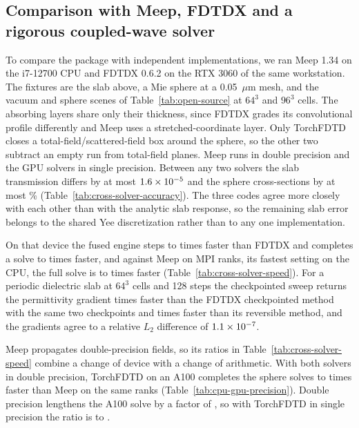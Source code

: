 \documentclass[11pt,a4paper]{article}
\newcommand{\micron}{\ensuremath{\mu\mathrm{m}}}
\begin{document}
\subsection{Comparison with Meep, FDTDX and a rigorous coupled-wave solver}
\label{sec:cross-solver}

To compare the package with independent implementations, we ran Meep 1.34 \citep{oskooi2010} on the i7-12700 CPU and FDTDX 0.6.2 \citep{mahlau2024} on the RTX 3060 of the same workstation. The fixtures are the slab above, a Mie sphere at a 0.05~\micron{} mesh, and the vacuum and sphere scenes of Table~\ref{tab:open-source} at $64^{3}$ and $96^{3}$ cells. The absorbing layers share only their thickness, since FDTDX grades its convolutional profile differently and Meep uses a stretched-coordinate layer. Only TorchFDTD closes a total-field/scattered-field box around the sphere, so the other two subtract an empty run from total-field planes. Meep runs in double precision and the GPU solvers in single precision. Between any two solvers the slab transmission differs by at most $1.6\times10^{-5}$ and the sphere cross-sections by at most \CrossSpherePair\% (Table~\ref{tab:cross-solver-accuracy}). The three codes agree more closely with each other than with the analytic slab response, so the remaining slab error belongs to the shared Yee discretization rather than to any one implementation.

On that device the fused engine steps \CrossFdtdxStepMin{} to \CrossFdtdxStepMax{} times faster than FDTDX and completes a solve \CrossFdtdxFullMin{} to \CrossFdtdxFullMax{} times faster, and against Meep on \CrossMeepRanks{} MPI ranks, its fastest setting on the CPU, the full solve is \CrossMeepFullMin{} to \CrossMeepFullMax{} times faster (Table~\ref{tab:cross-solver-speed}). For a periodic dielectric slab at $64^{3}$ cells and 128 steps the checkpointed sweep returns the permittivity gradient \CrossAdjointCheckpointRatio{} times faster than the FDTDX checkpointed method with the same two checkpoints and \CrossAdjointReversibleRatio{} times faster than its reversible method, and the gradients agree to a relative $L_2$ difference of $1.1\times10^{-7}$.

Meep propagates double-precision fields, so its ratios in Table~\ref{tab:cross-solver-speed} combine a change of device with a change of arithmetic. With both solvers in double precision, TorchFDTD on an A100 completes the sphere solves \PrecisionRatioMin{} to \PrecisionRatioMax{} times faster than Meep on the same \PrecisionMeepRanks{} ranks (Table~\ref{tab:cpu-gpu-precision}). Double precision lengthens the A100 solve by a factor of \PrecisionDoubleCost{}, so with TorchFDTD in single precision the ratio is \PrecisionSingleRatioMin{} to \PrecisionSingleRatioMax{}.
\end{document}
